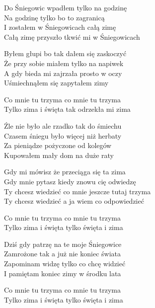 \begin{text}
    Do Śniegowic wpadłem tylko na godzinę\\
    Na godzinę tylko bo to zagranicą\\
    I zostałem w Śniegowicach całą zimę\\
    Całą zimę przyszło tkwić mi w Śniegowicach

    Byłem głupi bo tak dałem się zaskoczyć\\
    Że przy sobie miałem tylko na napiwek\\
    A gdy bieda mi zajrzała prosto w oczy\\
    Uśmiechnąłem się zapytałem zimy

    \vin Co mnie tu trzyma co mnie tu trzyma\\
    \vin Tylko zima i święta tak odrzekła mi zima

    Źle nie było ale rzadko tak do śmiechu\\
    Czasem śniegu było więcej niż herbaty\\
    Za pieniądze pożyczone od kolegów\\
    Kupowałem mały dom na duże raty

    Gdy mi mówisz że przeciąga się ta zima\\
    Gdy mnie pytasz kiedy znowu cię odwiedzę\\
    Ty chcesz wiedzieć co mnie jeszcze tutaj trzyma\\
    Ty chcesz wiedzieć a ja wiem co odpowiedzieć

    \vin Co mnie tu trzyma co mnie tu trzyma\\
    \vin Tylko zima i święta tylko święta i zima

    Dziś gdy patrzę na te moje Śniegowice\\
    Zamrożone tak a już nie koniec świata\\
    Zapominam widzę tylko co chcę widzieć\\
    I pamiętam koniec zimy w środku lata

    \vin Co mnie tu trzyma co mnie tu trzyma\\
    \vin Tylko zima i święta tylko święta i zima
\end{text}
